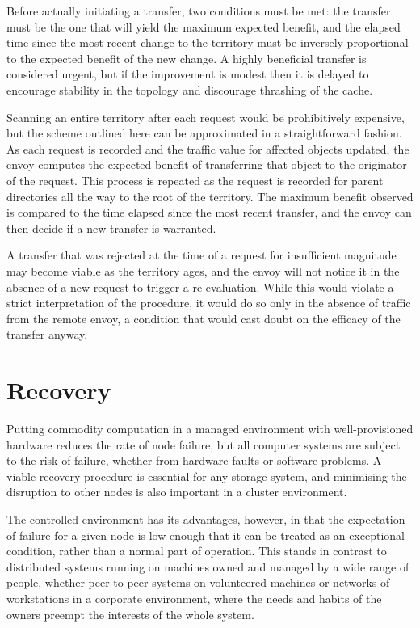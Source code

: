Before actually initiating a transfer, two conditions must be met: the transfer must be the one that will yield the maximum expected benefit, and the elapsed time since the most recent change to the territory must be inversely proportional to the expected benefit of the new change. A highly beneficial transfer is considered urgent, but if the improvement is modest then it is delayed to encourage stability in the topology and discourage thrashing of the cache.

Scanning an entire territory after each request would be prohibitively expensive, but the scheme outlined here can be approximated in a straightforward fashion. As each request is recorded and the traffic value for affected objects updated, the envoy computes the expected benefit of transferring that object to the originator of the request. This process is repeated as the request is recorded for parent directories all the way to the root of the territory. The maximum benefit observed is compared to the time elapsed since the most recent transfer, and the envoy can then decide if a new transfer is warranted.

A transfer that was rejected at the time of a request for insufficient magnitude may become viable as the territory ages, and the envoy will not notice it in the absence of a new request to trigger a re-evaluation. While this would violate a strict interpretation of the procedure, it would do so only in the absence of traffic from the remote envoy, a condition that would cast doubt on the efficacy of the transfer anyway.

\section{Recovery}\label{sec:envoy-recovery}

Putting commodity computation in a managed environment with well-provisioned hardware reduces the rate of node failure, but all computer systems are subject to the risk of failure, whether from hardware faults or software problems. A viable recovery procedure is essential for any storage system, and minimising the disruption to other nodes is also important in a cluster environment.

The controlled environment has its advantages, however, in that the expectation of failure for a given node is low enough that it can be treated as an exceptional condition, rather than a normal part of operation. This stands in contrast to distributed systems running on machines owned and managed by a wide range of people, whether peer-to-peer systems on volunteered machines or networks of workstations in a corporate environment, where the needs and habits of the owners preempt the interests of the whole system.

